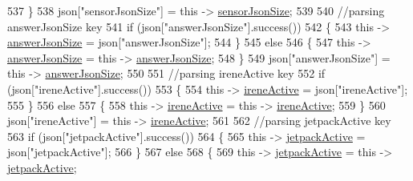 \begin{DoxyCode}
537             \}
538             json[\textcolor{stringliteral}{"sensorJsonSize"}] = \textcolor{keyword}{this} -> \hyperlink{classCoolBoard_a58e4b6072e3ac8b141ec0befb479208e}{sensorJsonSize};
539             
540             \textcolor{comment}{//parsing answerJsonSize key            }
541             \textcolor{keywordflow}{if} (json[\textcolor{stringliteral}{"answerJsonSize"}].success())
542             \{
543                 \textcolor{keyword}{this} -> \hyperlink{classCoolBoard_af2da1f85315b3d074a8b87d158094fb7}{answerJsonSize} = json[\textcolor{stringliteral}{"answerJsonSize"}];
544             \}
545             \textcolor{keywordflow}{else}
546             \{
547                 \textcolor{keyword}{this} -> \hyperlink{classCoolBoard_af2da1f85315b3d074a8b87d158094fb7}{answerJsonSize} = \textcolor{keyword}{this} -> \hyperlink{classCoolBoard_af2da1f85315b3d074a8b87d158094fb7}{answerJsonSize};
548             \}
549             json[\textcolor{stringliteral}{"answerJsonSize"}] = \textcolor{keyword}{this} -> \hyperlink{classCoolBoard_af2da1f85315b3d074a8b87d158094fb7}{answerJsonSize};
550             
551             \textcolor{comment}{//parsing ireneActive key           }
552             \textcolor{keywordflow}{if} (json[\textcolor{stringliteral}{"ireneActive"}].success())
553             \{
554                 \textcolor{keyword}{this} -> \hyperlink{classCoolBoard_a9c3f7ac625481ee2ae802a25d97a4ae0}{ireneActive} = json[\textcolor{stringliteral}{"ireneActive"}];
555             \}
556             \textcolor{keywordflow}{else}
557             \{
558                 \textcolor{keyword}{this} -> \hyperlink{classCoolBoard_a9c3f7ac625481ee2ae802a25d97a4ae0}{ireneActive} = \textcolor{keyword}{this} -> \hyperlink{classCoolBoard_a9c3f7ac625481ee2ae802a25d97a4ae0}{ireneActive};
559             \}
560             json[\textcolor{stringliteral}{"ireneActive"}] = \textcolor{keyword}{this} -> \hyperlink{classCoolBoard_a9c3f7ac625481ee2ae802a25d97a4ae0}{ireneActive};
561             
562             \textcolor{comment}{//parsing jetpackActive key}
563             \textcolor{keywordflow}{if} (json[\textcolor{stringliteral}{"jetpackActive"}].success())
564             \{
565                 \textcolor{keyword}{this} -> \hyperlink{classCoolBoard_a9be03a913d26e558328935ca3b59a75e}{jetpackActive} = json[\textcolor{stringliteral}{"jetpackActive"}];
566             \}
567             \textcolor{keywordflow}{else}
568             \{
569                 \textcolor{keyword}{this} -> \hyperlink{classCoolBoard_a9be03a913d26e558328935ca3b59a75e}{jetpackActive} = \textcolor{keyword}{this} -> \hyperlink{classCoolBoard_a9be03a913d26e558328935ca3b59a75e}{jetpackActive};

\end{DoxyCode}
